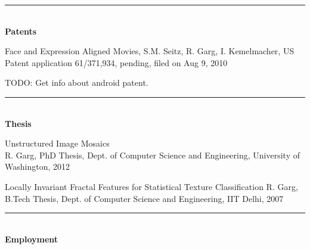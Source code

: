 \documentclass[10pt]{article}
\newenvironment{itemize*}%
  {\begin{itemize}%
    \setlength{\itemsep}{0pt}%
    \setlength{\parskip}{0pt}%
	}
  {\end{itemize}}
\begin{document}
\rule{6.5in}{2pt}
\\
\vspace{0.10in}
{\large \textbf{Patents}}
\begin{itemize*}
\item Face and Expression Aligned Movies, S.M. Seitz, R. Garg, I. Kemelmacher, US Patent application 61/371,934, pending, filed on Aug 9, 2010
\end{itemize*}
\begin{itemize*}
\item TODO: Get info about android patent.
\end{itemize*}
\rule{6.5in}{2pt}
\\
\vspace{0.10in}
{\large \textbf{Thesis}}
\begin{itemize*}
\item Unstructured Image Mosaics\\
R. Garg, PhD Thesis, Dept. of Computer Science and Engineering, University of Washington, 2012
\end{itemize*}
\begin{itemize*}
\item Locally Invariant Fractal Features for Statistical Texture Classification 
R. Garg, B.Tech Thesis, Dept. of Computer Science and Engineering, IIT Delhi, 2007
\end{itemize*}
\rule{6.5in}{2pt}
\\
\vspace{0.10in}
{\large \textbf{Employment}}
\end{document}
